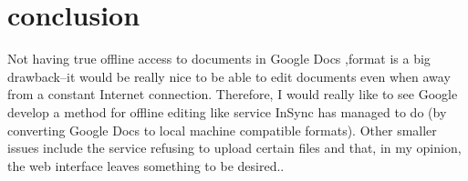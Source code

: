 \documentclass[10pt,]{article}
\begin{document}
\section{conclusion}
Not having true offline access to documents in Google Docs ,format is a big drawback–it would be really nice to be able to edit documents even when away from a constant Internet connection. Therefore, I would really like to see Google develop a method for offline editing like service InSync has managed to do (by converting Google Docs to local machine compatible formats). Other smaller issues include the service refusing to upload certain files and that, in my opinion, the web interface leaves something to be desired.\cite{s11}.


   
\end{document}
